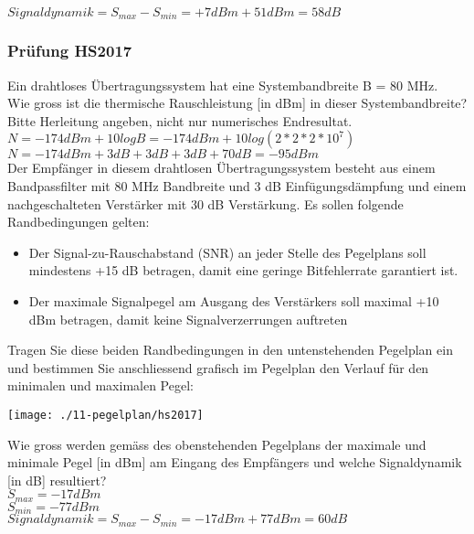 $Signaldynamik = S_{max}-S_{min}=+7dBm+51dBm=58dB$

\subsubsection{Prüfung HS2017}
Ein drahtloses Übertragungssystem hat eine Systembandbreite B = 80 MHz.\\

Wie gross ist die thermische Rauschleistung [in dBm] in dieser Systembandbreite? Bitte Herleitung angeben, nicht nur numerisches Endresultat.\\
$N=-174dBm+10logB=-174dBm+10log(2*2*2*10^7)$\\
$N=-174dBm + 3 dB + 3 dB + 3 dB + 70 dB = -95dBm$\\

Der Empfänger in diesem drahtlosen Übertragungssystem besteht aus einem Bandpassfilter mit 80 MHz Bandbreite und 3 dB Einfügungsdämpfung und einem nachgeschalteten
Verstärker mit 30 dB Verstärkung. Es sollen folgende Randbedingungen gelten:
\begin{itemize}
    \item Der Signal-zu-Rauschabstand (SNR) an jeder Stelle des Pegelplans soll mindestens +15 dB betragen, damit eine geringe Bitfehlerrate garantiert ist.
    \item Der maximale Signalpegel am Ausgang des Verstärkers soll maximal +10 dBm betragen, damit keine Signalverzerrungen auftreten
\end{itemize}
Tragen Sie diese beiden Randbedingungen in den untenstehenden Pegelplan ein und bestimmen Sie anschliessend grafisch im Pegelplan den Verlauf für den minimalen und
maximalen Pegel:
\begin{center}
    \vspace{-8pt}
    \texttt{[image: ./11-pegelplan/hs2017]}
    \vspace{-8pt}
\end{center}

Wie gross werden gemäss des obenstehenden Pegelplans der maximale und minimale Pegel [in dBm] am Eingang des Empfängers und welche Signaldynamik [in dB] resultiert?\\
$S_{max}=-17dBm$\\
$S_{min}=-77dBm$\\

$Signaldynamik = S_{max}-S_{min}=-17dBm+77dBm=60dB$
